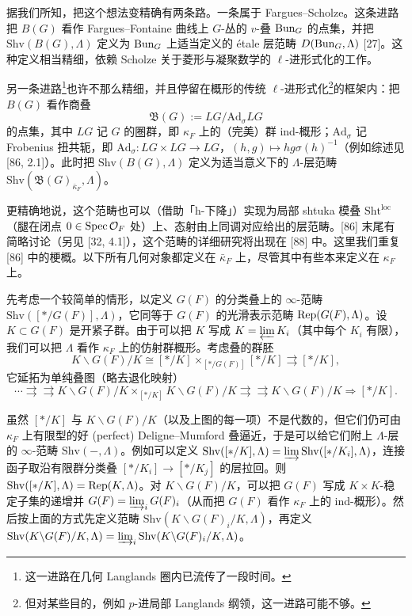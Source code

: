 据我们所知，把这个想法变精确有两条路。一条属于 Fargues–Scholze。这条进路把 $B(G)$ 看作 Fargues–Fontaine 曲线上 $G$-丛的 $v$-叠 $\operatorname{Bun}_G$ 的点集，并把 $\mathrm{Shv}(B(G),\Lambda)$ 定义为 $\operatorname{Bun}_G$ 上适当定义的 étale 层范畴 $D(\operatorname{Bun}_G,\Lambda)$ [27]。这种定义相当精细，依赖 Scholze 关于菱形与凝聚数学的 $\ell$-进形式化的工作。

另一条进路\footnote{这一进路在几何 Langlands 圈内已流传了一段时间。}也许不那么精细，并且停留在概形的传统 $\ell$-进形式化\footnote{但对某些目的，例如 $p$-进局部 Langlands 纲领，这一进路可能不够。}的框架内：把 $B(G)$ 看作商叠
\[
\mathfrak B(G):=LG/\mathrm{Ad}_\sigma LG
\]
的点集，其中 $LG$ 记 $G$ 的圈群，即 $\kappa_F$ 上的（完美）群 ind-概形；$\mathrm{Ad}_\sigma$ 记 Frobenius 扭共轭，即 $\mathrm{Ad}_\sigma:LG\times LG\to LG$，$(h,g)\mapsto hg\sigma(h)^{-1}$（例如综述见 [86, 2.1]）。此时把 $\mathrm{Shv}(B(G),\Lambda)$ 定义为适当意义下的 $\Lambda$-层范畴 $\mathrm{Shv}(\mathfrak B(G)_{\bar\kappa_F},\Lambda)$。

更精确地说，这个范畴也可以（借助「h-下降」）实现为局部 shtuka 模叠 $\mathrm{Sht}^{\mathrm{loc}}$（腿在闭点 $0\in\operatorname{Spec}\mathcal O_F$ 处）上、态射由上同调对应给出的层范畴。[86] 末尾有简略讨论（另见 [32, 4.1]），这个范畴的详细研究将出现在 [88] 中。这里我们重复 [86] 中的梗概。以下所有几何对象都定义在 $\bar\kappa_F$ 上，尽管其中有些本来定义在 $\kappa_F$ 上。

先考虑一个较简单的情形，以定义 $G(F)$ 的分类叠上的 $\infty$-范畴 $\mathrm{Shv}([*/G(F)],\Lambda)$，它同等于 $G(F)$ 的光滑表示范畴 $\operatorname{Rep}(G(F),\Lambda)$。设 $K\subset G(F)$ 是开紧子群。由于可以把 $K$ 写成 $K=\varprojlim K_i$（其中每个 $K_i$ 有限），我们可以把 $\Lambda$ 看作 $\kappa_F$ 上的仿射群概形。考虑叠的群胚
\[
K\backslash G(F)/K\cong[*/K]\times_{[*/G(F)]}[*/K]\rightrightarrows[*/K],
\]
它延拓为单纯叠图（略去退化映射）
\begin{equation}
\cdots\rightrightarrows\rightrightarrows K\backslash G(F)/K\times_{[*/K]}K\backslash G(F)/K\rightrightarrows\rightrightarrows K\backslash G(F)/K\Rightarrow[*/K]. \tag{4.20}\label{eq:a2-4-20}
\end{equation}

虽然 $[*/K]$ 与 $K\backslash G(F)/K$（以及上图的每一项）不是代数的，但它们仍可由 $\kappa_F$ 上有限型的好 (perfect) Deligne–Mumford 叠逼近，于是可以给它们附上 $\Lambda$-层的 $\infty$-范畴 $\mathrm{Shv}(-,\Lambda)$。例如可以定义 $\mathrm{Shv}([*/K],\Lambda)=\varinjlim\mathrm{Shv}([*/K_i],\Lambda)$，连接函子取沿有限群分类叠 $[*/K_i]\to[*/K_j]$ 的层拉回。则 $\mathrm{Shv}([*/K],\Lambda)=\operatorname{Rep}(K,\Lambda)$。对 $K\backslash G(F)/K$，可以把 $G(F)$ 写成 $K\times K$-稳定子集的递增并 $G(F)=\varinjlim_i G(F)_i$（从而把 $G(F)$ 看作 $\kappa_F$ 上的 ind-概形）。然后按上面的方式先定义范畴 $\mathrm{Shv}(K\backslash G(F)_i/K,\Lambda)$，再定义 $\mathrm{Shv}(K\backslash G(F)/K,\Lambda)=\varinjlim_i\mathrm{Shv}(K\backslash G(F)_i/K,\Lambda)$。

